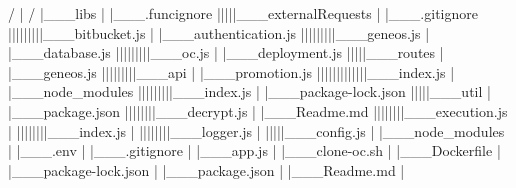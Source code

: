               /                                        |                     /                                          
              |___libs                                 |                     |___.funcignore                                        
              |||||___externalRequests                 |                     |___.gitignore                                         
              |||||||||___bitbucket.js                 |                     |___authentication.js                                          
              |||||||||___geneos.js                    |                     |___database.js                                        
              |||||||||___oc.js                        |                     |___deployment.js                                          
              |||||___routes                           |                     |___geneos.js                                          
              |||||||||___api                          |                     |___promotion.js                                           
              |||||||||||||___index.js                 |                     |___node_modules                                           
              |||||||||___index.js                     |                     |___package-lock.json                                          
              |||||___util                             |                     |___package.json                                           
              ||||||||___decrypt.js                    |                     |___Readme.md                                          
              ||||||||___execution.js                  |                                                   
              ||||||||___index.js                      |                                               
              ||||||||___logger.js                     |                                                
              |||||___config.js                        |                                             
              |___node_modules                         |                                            
              |___.env                                 |                                    
              |___.gitignore                           |                                          
              |___app.js                               |                                      
              |___clone-oc.sh                          |                                           
              |___Dockerfile                           |                                          
              |___package-lock.json                    |                                                 
              |___package.json                         |                                            
              |___Readme.md                            |                                         


